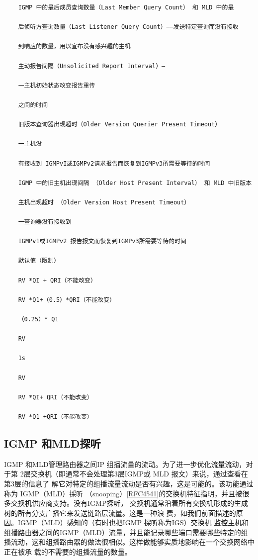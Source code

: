 \begin{verbatim}
    IGMP 中的最后成员查询数量（Last Member Query Count） 和 MLD 中的最

    后侦听方查询数量（Last Listener Query Count）——发送特定查询而没有接收

    到响应的数量，用以宣布没有感兴趣的主机

    主动报告间隔（Unsolicited Report Interval）—

    一主机初始状态改变报告重传

    之间的时间

    旧版本查询器出现超时（Older Version Querier Present Timeout）

    一主机没

    有接收到 IGMPvI或IGMPv2请求报告而恢复到IGMPv3所需要等待的时间

    IGMP 中的旧主机出现间隔 （Older Host Present Interval） 和 MLD 中旧版本

    主机出现超时 （Older Version Host Present Timeout）

    一查询器没有接收到

    IGMPv1或IGMPv2 报告报文而恢复到IGMPv3所需要等待的时间

    默认值（限制）

    RV *QI + QRI（不能改变）

    RV *Q1+（0.5）*QRI（不能改变）

    （0.25）* Q1

    RV

    1s

    RV

    RV *QI+ QRI（不能改变）

    RV *Q1 +QRI（不能改变）
\end{verbatim}

\subsection{IGMP 和MLD探听}
IGMP 和MLD管理路由器之间IP 组播流量的流动。为了进一步优化流量流动，对于第
2层交换机（即通常不会处理第3层IGMP或 MLD 报文）来说，通过查看在第3层的信息了
解它对特定的组播流量流动是否有兴趣，这是可能的。该功能通过称为 IGMP（MLD）採听
（snooping）\href{https://www.rfc-editor.org/rfc/rfc4541}{[RFC4541]}的交换机特征指明，并且被很多交换机供应商支持。没有IGMP探听，
交换机通常沿着所有交换机形成的生成树的所有分支广播它来发送链路层流量。这是一种浪
费，如我们前面描述的原因。IGMP（MLD）感知的（有时也把IGMP 探听称为IGS）交换机
监控主机和组播路由器之间的IGMP（MLD）流量，并且能记录哪些端口需要哪些特定的组
播流动，这和组播路由器的做法很相似。这样做能够实质地影响在一个交换网络中正在被承
载的不需要的组播流量的数量。

